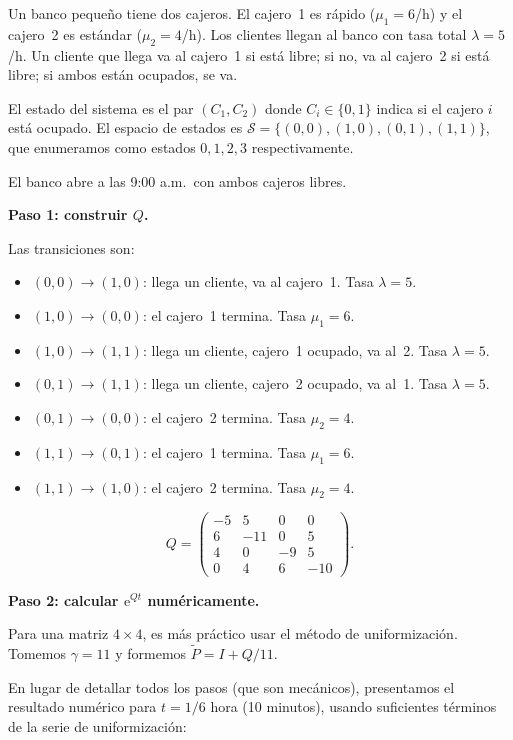 \documentclass[11pt,a4paper]{article}
\theoremstyle{definition}
\theoremstyle{remark}
\newcommand{\e}{\mathrm{e}}
\begin{document}
\begin{ejemplo}
Un banco pequeño tiene dos cajeros.  El cajero~1 es rápido ($\mu_1=6$/h)
y el cajero~2 es estándar ($\mu_2=4$/h).  Los clientes llegan al
banco con tasa total $\lambda=5$/h.  Un cliente que llega va al cajero~1
si está libre; si no, va al cajero~2 si está libre; si ambos están
ocupados, se va.

El estado del sistema es el par $(C_1,C_2)$ donde $C_i\in\{0,1\}$
indica si el cajero $i$ está ocupado.  El espacio de estados es
$\mathcal{S}=\{(0,0),(1,0),(0,1),(1,1)\}$, que enumeramos como estados
$0,1,2,3$ respectivamente.

El banco abre a las 9:00 a.m.\ con ambos cajeros libres.

\tcblower

\textbf{Paso 1: construir $Q$.}

Las transiciones son:
\begin{itemize}[nosep]
  \item $(0,0)\to(1,0)$: llega un cliente, va al cajero~1. Tasa $\lambda=5$.
  \item $(1,0)\to(0,0)$: el cajero~1 termina. Tasa $\mu_1=6$.
  \item $(1,0)\to(1,1)$: llega un cliente, cajero~1 ocupado, va al~2. Tasa $\lambda=5$.
  \item $(0,1)\to(1,1)$: llega un cliente, cajero~2 ocupado, va al~1. Tasa $\lambda=5$.
  \item $(0,1)\to(0,0)$: el cajero~2 termina. Tasa $\mu_2=4$.
  \item $(1,1)\to(0,1)$: el cajero~1 termina. Tasa $\mu_1=6$.
  \item $(1,1)\to(1,0)$: el cajero~2 termina. Tasa $\mu_2=4$.
\end{itemize}

\[
  Q = \begin{pmatrix}
    -5 & 5  & 0 & 0  \\
    6  & -11 & 0 & 5  \\
    4  & 0  & -9 & 5  \\
    0  & 4  & 6  & -10
  \end{pmatrix}.
\]

\textbf{Paso 2: calcular $\e^{Qt}$ numéricamente.}

Para una matriz $4\times 4$, es más práctico usar el método de
uniformización.  Tomemos $\gamma = 11$ y formemos
$\tilde{P} = I + Q/11$.

En lugar de detallar todos los pasos (que son mecánicos), presentamos
el resultado numérico para $t=1/6$ hora (10 minutos), usando
suficientes términos de la serie de uniformización:


\end{ejemplo}
\end{document}
